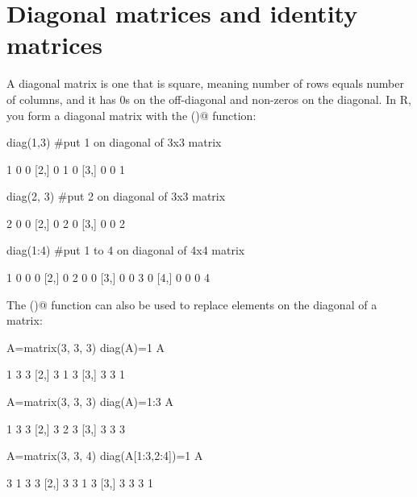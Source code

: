 \section{Diagonal matrices and identity matrices}
A diagonal matrix is one that is square, meaning number of rows equals number of columns, and it has 0s on the off-diagonal and non-zeros on the diagonal.  In R, you form a diagonal matrix with the \verb@diag()@ function:
\begin{Schunk}
\begin{Sinput}
 diag(1,3) #put 1 on diagonal of 3x3 matrix
\end{Sinput}
\begin{Soutput}
     [,1] [,2] [,3]
[1,]    1    0    0
[2,]    0    1    0
[3,]    0    0    1
\end{Soutput}
\begin{Sinput}
 diag(2, 3) #put 2 on diagonal of 3x3 matrix
\end{Sinput}
\begin{Soutput}
     [,1] [,2] [,3]
[1,]    2    0    0
[2,]    0    2    0
[3,]    0    0    2
\end{Soutput}
\begin{Sinput}
 diag(1:4) #put 1 to 4 on diagonal of 4x4 matrix
\end{Sinput}
\begin{Soutput}
     [,1] [,2] [,3] [,4]
[1,]    1    0    0    0
[2,]    0    2    0    0
[3,]    0    0    3    0
[4,]    0    0    0    4
\end{Soutput}
\end{Schunk}
The \verb@diag()@ function can also be used to replace elements on the diagonal of a matrix:
\begin{Schunk}
\begin{Sinput}
 A=matrix(3, 3, 3)
 diag(A)=1
 A
\end{Sinput}
\begin{Soutput}
     [,1] [,2] [,3]
[1,]    1    3    3
[2,]    3    1    3
[3,]    3    3    1
\end{Soutput}
\begin{Sinput}
 A=matrix(3, 3, 3)
 diag(A)=1:3
 A
\end{Sinput}
\begin{Soutput}
     [,1] [,2] [,3]
[1,]    1    3    3
[2,]    3    2    3
[3,]    3    3    3
\end{Soutput}
\begin{Sinput}
 A=matrix(3, 3, 4)
 diag(A[1:3,2:4])=1
 A
\end{Sinput}
\begin{Soutput}
     [,1] [,2] [,3] [,4]
[1,]    3    1    3    3
[2,]    3    3    1    3
[3,]    3    3    3    1
\end{Soutput}
\end{Schunk}
